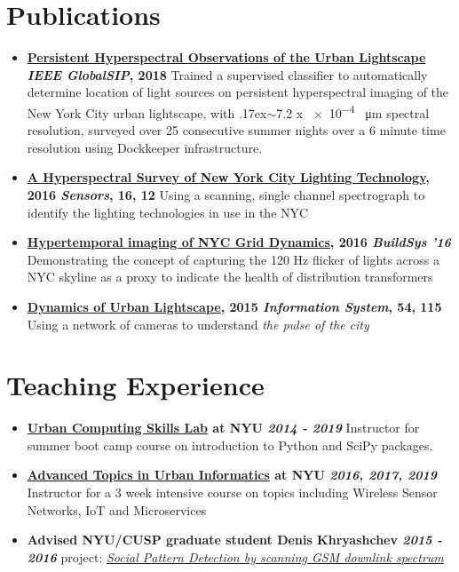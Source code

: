 \documentclass[letterpaper,10.5pt]{article}
\newcommand{\resumePubItem}[3]{
	\item\small{
		\textbf{#1 \null\hfill{#2}}{#3} \vspace{-2pt}
	}
}
\newcommand{\resumePublicationItem}[3]{\resumePubItem{#1}{#2}\newline{#3}\vspace{-4pt}}
\newcommand{\resumeSubHeadingListStart}{\begin{itemize}[leftmargin=*]}
\newcommand{\resumeSubHeadingListEnd}{\end{itemize}}
\newcommand{\resumeTilde}{\raise.17ex\hbox{$\scriptstyle\sim$}}
\begin{document}
\section{\color[HTML]{DF691A} Publications}
  \resumeSubHeadingListStart
  	\resumePublicationItem{\href{https://ieeexplore.ieee.org/document/8646419}{Persistent Hyperspectral Observations of the Urban Lightscape}}{\textit{IEEE GlobalSIP}, 2018}{Trained a supervised classifier to automatically determine location of light sources on persistent hyperspectral imaging of the New York City urban lightscape, with \resumeTilde 7.2 x \num{e-4} \SI{}{\micro\metre} spectral resolution, surveyed over 25 consecutive summer nights over a 6 minute time resolution using Dockkeeper infrastructure.}
    \resumePublicationItem{\href{http://www.mdpi.com/1424-8220/16/12/2047/html}{A Hyperspectral Survey of New York City Lighting Technology}, 2016}{\textit{Sensors}, 16, 12} 
    {Using a scanning, single channel spectrograph to identify the lighting technologies in use in the NYC}
    \resumePublicationItem{\href{http://dl.acm.org/citation.cfm?id=2993570}{Hypertemporal imaging of NYC Grid Dynamics}, 2016}{\textit{BuildSys '16}}  
    {Demonstrating the concept of capturing the 120 Hz flicker of lights across a NYC skyline as a proxy to indicate the health of distribution transformers}
    \resumePublicationItem{\href{http://www.sciencedirect.com/science/article/pii/S0306437915001167}{Dynamics of Urban Lightscape},  2015}{\textit{Information System}, 54, 115}    
    {Using a network of cameras to understand \textit{the pulse of the city}}
  \resumeSubHeadingListEnd

\section{\color[HTML]{DF691A} Teaching Experience}
  \resumeSubHeadingListStart
    \resumePublicationItem{ \href{https://sharmamohit.com/\#teaching}{\textbf{Urban Computing Skills Lab}} at NYU}{\textit{2014 - 2019}}
    {Instructor for summer boot camp course on introduction to Python and SciPy packages.}
    \resumePublicationItem{ \href{https://sharmamohit.com/\#teaching}{\textbf{Advanced Topics in Urban Informatics}} at NYU}{\textit{2016, 2017, 2019}}
    {Instructor for a 3 week intensive course on topics including Wireless Sensor Networks, IoT and Microservices}
    \resumePublicationItem{Advised NYU/CUSP graduate student Denis Khryashchev}{\textit{2015 - 2016}}{project: \href{https://www.overleaf.com/read/ssrzkqkznpkw}{\textit{Social Pattern Detection by scanning GSM downlink spectrum}}}
  \resumeSubHeadingListEnd
\end{document}
